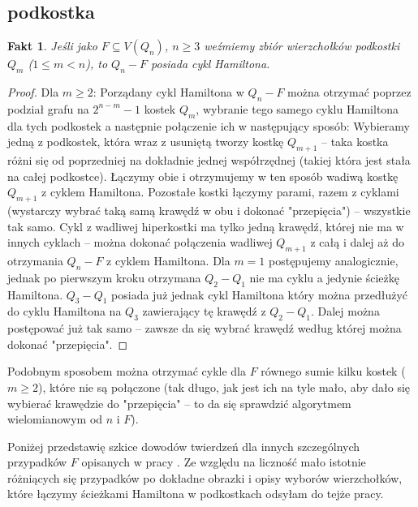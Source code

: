 \documentclass{pracamgr}
\newtheorem{fact}[theorem]{Fakt}
\begin{document}
   \subsection{podkostka}
    \begin{fact}\label{hamilton dla F=Q_m}
     Jeśli jako $F\subseteq V(Q_n)$, $n\ge3$ weźmiemy zbiór wierzchołków podkostki $Q_m$ ($1\le m<n$), to $Q_n-F$ posiada cykl Hamiltona.
    \end{fact}
    \begin{proof}
     Dla $m\ge2$:\newline 
     Porządany cykl Hamiltona w $Q_n-F$ można otrzymać poprzez podział grafu na $2^{n-m}-1$ kostek $Q_m$, wybranie tego samego cyklu Hamiltona dla tych podkostek
     a następnie połączenie ich w następujący sposób:\newline
     Wybieramy jedną z podkostek, która wraz z usuniętą tworzy kostkę $Q_{m+1}$ -- taka kostka różni się od poprzedniej na dokładnie jednej współrzędnej
     (takiej która jest stała na całej podkostce). Łączymy obie i otrzymujemy w ten sposób wadiwą kostkę $Q_{m+1}$ z cyklem Hamiltona.
     Pozostałe kostki łączymy parami, razem z cyklami (wystarczy wybrać taką samą krawędź w obu i dokonać "przepięcia") -- wszystkie tak samo.
     Cykl z wadliwej hiperkostki ma tylko jedną krawędź, której nie ma w innych cyklach -- można dokonać połączenia wadliwej $Q_{m+1}$ z całą i dalej aż
     do otrzymania $Q_n-F$ z cyklem Hamiltona.\newline
     Dla $m=1$ postępujemy analogicznie, jednak po pierwszym kroku otrzymana $Q_2-Q_1$ nie ma cyklu a jedynie ścieżkę Hamiltona. $Q_3-Q_1$
     posiada już jednak cykl Hamiltona który można przedłużyć do cyklu Hamiltona na $Q_3$ zawierający tę krawędź z $Q_2-Q_1$.
     Dalej można postępować już tak samo -- zawsze da się wybrać krawędź według której można dokonać "przepięcia".
    \end{proof}
    Podobnym sposobem można otrzymać cykle dla $F$ równego sumie kilku kostek ($m\ge2$), które nie są połączone (tak długo, jak jest ich na tyle mało,
    aby dało się wybierać krawędzie do "przepięcia" -- to da się sprawdzić algorytmem wielomianowym od $n$ i $F$).\newline
   
   Poniżej przedstawię szkice dowodów twierdzeń dla innych szczególnych przypadków $F$ opisanych w pracy \cite{Pegr}.
   Ze względu na liczność mało istotnie różniących się przypadków po dokładne obrazki i opisy wyborów wierzchołków,
   które łączymy ścieżkami Hamiltona w podkostkach odsyłam do tejże pracy.
\end{document}
